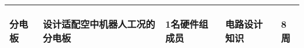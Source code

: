 \begin{longtable}{ p{2cm} | p{3cm} | p{3cm} | p{4.8cm} | p{2cm} |}
    \hline
    
        \begin{center}
            分电板
        \end{center} &
        \begin{center}
            设计适配空中机器人工况的分电板
        \end{center} &
        \begin{center}
            1名硬件组成员
        \end{center} &
        \begin{center}
            电路设计知识
        \end{center} &
        \begin{center}
            8周
        \end{center}\\

    \hline
    
\end{longtable}
